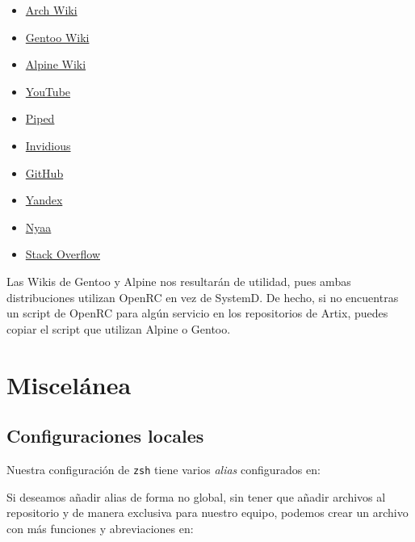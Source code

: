 \documentclass[11pt]{article}
\begin{document}
\begin{multicols}{5}
\scriptsize
\begin{itemize}
\setlength\itemindent{-0.75em}
\setlength\itemsep{-0.35em}
\item \href{https://wiki.archlinux.org/}{Arch Wiki}
\item \href{https://wiki.gentoo.org/wiki/Main_Page}{Gentoo Wiki}
\item \href{https://wiki.alpinelinux.org/wiki/Main_Page}{Alpine Wiki}
\item \href{https://www.youtube.com/}{YouTube}
\item \href{https://nyc1.pi.ggtyler.dev/trending}{Piped}
\item \href{https://iv.ggtyler.dev/feed/popular}{Invidious}
\item \href{https://github.com/}{GitHub}
\item \href{https://yandex.com/}{Yandex}
\item \href{https://nyaa.si/}{Nyaa}
\item \href{https://stackoverflow.com/}{Stack Overflow}
\end{itemize}
\end{multicols}

Las Wikis de Gentoo y Alpine nos resultarán de utilidad, pues ambas distribuciones utilizan OpenRC en vez de SystemD. De hecho, si no encuentras un script de OpenRC para algún servicio en los repositorios de Artix, puedes copiar el script que utilizan Alpine o Gentoo.

\section{Miscelánea}

\subsection*{Configuraciones locales}

Nuestra configuración de \texttt{zsh} tiene varios \emph{alias} configurados en:

\begin{center}
\end{center}

Si deseamos añadir alias de forma no global, sin tener que añadir archivos al repositorio y de manera exclusiva para nuestro equipo, podemos crear un archivo con más funciones y abreviaciones en:

\begin{center}
\end{center}
\end{document}

